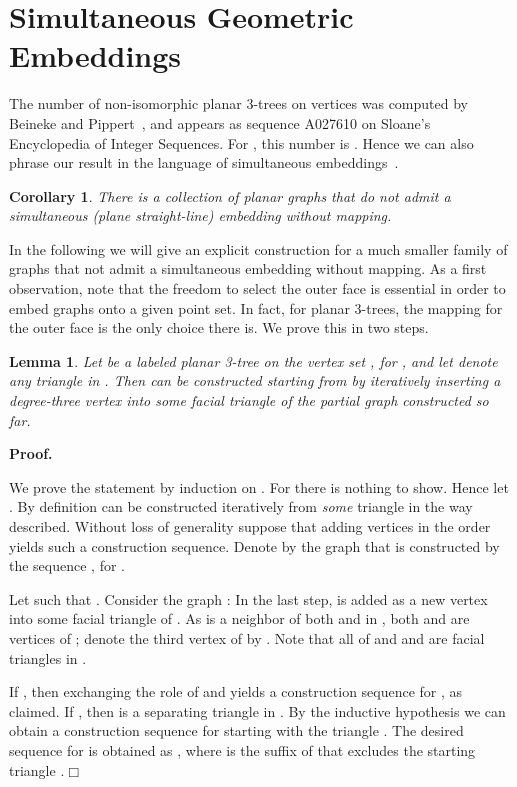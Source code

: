 \documentclass[11pt]{article}
\newtheorem{lemma}[equation]{Lemma}
\newtheorem{corollary}[equation]{Corollary}
\newcommand{\qed}{\hfill\ensuremath{\Box}}
\newenvironment{proof}{\noindent\textbf{Proof.}
}{\par\medskip}
\begin{document}
\section{Simultaneous Geometric Embeddings}
\label{sec:sim}

The number of non-isomorphic planar 3-trees on  vertices was computed by
Beineke and Pippert~\cite{BP74}, and appears as sequence A027610 on Sloane's
Encyclopedia of Integer Sequences. For , this number is .  Hence
we can also phrase our result in the language of simultaneous
embeddings~\cite{bcdeeiklm-spge-07}.
\begin{corollary}
  There is a collection of  planar graphs that do not admit a
  simultaneous (plane straight-line) embedding without mapping.
\end{corollary}
In the following we will give an explicit construction for a much smaller family
of graphs that not admit a simultaneous embedding without mapping. As a first
observation, note that the freedom to select the outer face is essential in
order to embed graphs onto a given point set. In fact, for planar 3-trees, the
mapping for the outer face is the only choice there is. We prove this in two
steps.
\begin{lemma}
  \label{lem:stacked_any_face}
  Let  be a labeled planar 3-tree on the vertex set , for , and
  let  denote any triangle in . Then  can be constructed starting from
   by iteratively inserting a degree-three vertex into some facial triangle
  of the partial graph constructed so far.
\end{lemma}
\begin{proof}
  We prove the statement by induction on . For  there is nothing to
  show. Hence let . By definition  can be constructed iteratively from
  \emph{some} triangle in the way described. Without loss of generality suppose
  that adding vertices in the order  yields such a construction
  sequence. Denote by  the graph that is constructed by the sequence
  , for .

  Let  such that . Consider the graph : In the last step,
   is added as a new vertex into some facial triangle  of . As
   is a neighbor of both  and  in , both  and  are vertices of
  ; denote the third vertex of  by . Note that all of  and
   and  are facial triangles in .

  If , then exchanging the role of  and  yields a construction
  sequence  for , as claimed. If , then 
  is a separating triangle in . By the inductive hypothesis we can obtain a
  construction sequence  for  starting with the triangle
  . The desired sequence for  is obtained as
  , where  is the suffix of  that excludes the
  starting triangle .\qed
\end{proof}
\end{document}

